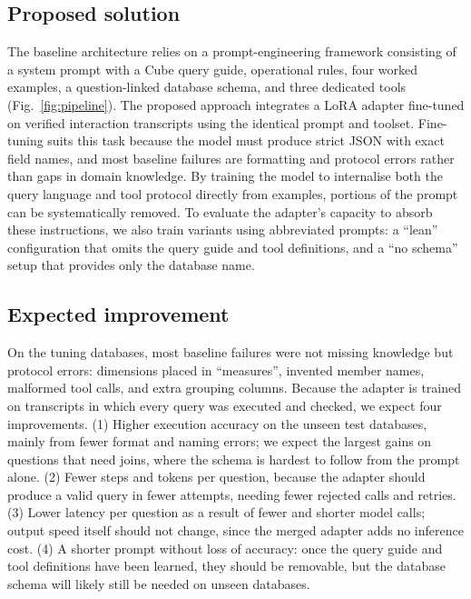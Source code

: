 \subsection{Proposed solution}
The baseline architecture relies on a prompt-engineering framework consisting of a system prompt with a Cube query guide, operational rules, four worked examples, a question-linked database schema, and three dedicated tools (Fig.~\ref{fig:pipeline}). The proposed approach integrates a LoRA adapter fine-tuned on verified interaction transcripts using the identical prompt and toolset. Fine-tuning suits this task because the model must produce strict JSON with exact field names, and most baseline failures are formatting and protocol errors rather than gaps in domain knowledge. By training the model to internalise both the query language and tool protocol directly from examples, portions of the prompt can be systematically removed. To evaluate the adapter's capacity to absorb these instructions, we also train variants using abbreviated prompts: a ``lean'' configuration that omits the query guide and tool definitions, and a ``no schema'' setup that provides only the database name.


\subsection{Expected improvement}
On the tuning databases, most baseline failures were not missing knowledge but protocol errors: dimensions placed in ``measures'', invented member names, malformed tool calls, and extra grouping columns. Because the adapter is trained on transcripts in which every query was executed and checked, we expect four improvements. (1) Higher execution accuracy on the unseen test databases, mainly from fewer format and naming errors; we expect the largest gains on questions that need joins, where the schema is hardest to follow from the prompt alone. (2) Fewer steps and tokens per question, because the adapter should produce a valid query in fewer attempts, needing fewer rejected calls and retries. (3) Lower latency per question as a result of fewer and shorter model calls; output speed itself should not change, since the merged adapter adds no inference cost. (4) A shorter prompt without loss of accuracy: once the query guide and tool definitions have been learned, they should be removable, but the database schema will likely still be needed on unseen databases.


